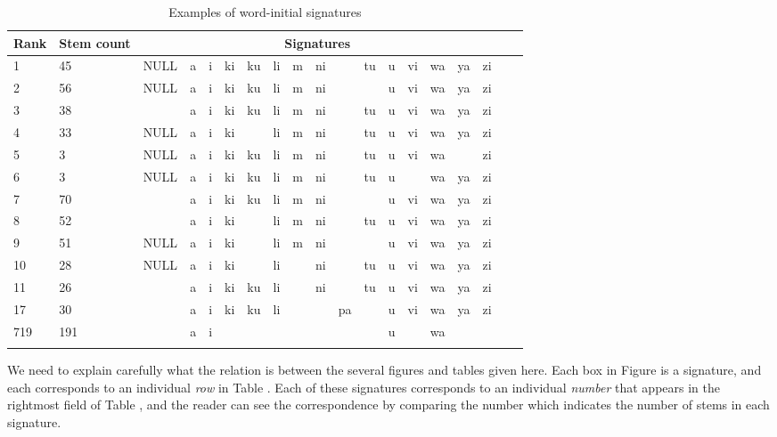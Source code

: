 \documentclass[output=paper,colorlinks,citecolor=brown]{langscibook}
\begin{document}
%
% 
\begin{table}
\begin{tabular}{lllllllllllllllllll}\lsptoprule
Rank& Stem count & \multicolumn{15}{c}{Signatures} \\ \midrule
1 & 45 & NULL & a &  i &  ki &  ku &  li &  m &  ni  &&  tu &  u &  vi &  wa &  ya &  zi \\
2 & 56 & NULL & a &  i &  ki &  ku &  li &  m &  ni &   & &  u &  vi &  wa & ya  &  zi   \\
3 & 38 &      & a &  i &  ki &  ku &  li &  m &  ni  &&  tu &  u &  vi &  wa &  ya &  zi \\
4 & 33 &  NULL & a &  i &  ki &  &  li &  m &  ni &   &  tu &  u &  vi &  wa &  ya &  zi  \\
5 & 3  & NULL & a &  i &  ki &  ku &  li &  m &  ni &   &  tu &  u &  vi &  wa &    &  zi\\
6 & 3 & NULL & a &  i &  ki &  ku &  li &  m &  ni &  &  tu &  u &   &  wa &  ya &  zi  \\
7 & 70 &    & a &  i &  ki &  ku &  li &  m &  ni  &&    &  u &  vi &  wa &  ya &  zi  \\
8 & 52 &   & a &  i &  ki &   &  li &  m &  ni &  &  tu  &  u &  vi &  wa &  ya &  zi  \\
9 & 51 & NULL & a &  i &  ki &   &  li & m &  ni &   &   &  u &  vi &  wa &  ya &  zi\\
10 & 28  & NULL & a &  i &  ki &   &  li &   & ni  &   &  tu &  u &  vi &  wa &  ya &  zi\\
11 & 26 & & a &  i &  ki & ku  &  li &    &  ni &   &  tu &  u &  vi &  wa &  ya &  zi \\
17 &  30 &  & a &  i &  ki &  ku &  li &   &    & pa &    &  u &  vi &  wa &  ya &  zi \\
719  & 191 && a &i &&&&&&&&u &&wa  \\  \lspbottomrule
\end{tabular}
\caption{Examples of word-initial signatures}
\label{topsigexamples}
\end{table}



  


We need to explain carefully what the relation is between the several figures and tables given here. Each box in Figure  is a signature, and each corresponds to an individual \textit{row} in Table . Each of these signatures corresponds to an individual \textit{number} that appears in the rightmost field of  Table , and the reader can see the correspondence by comparing the number which indicates the number of stems in each signature.
\end{document}
